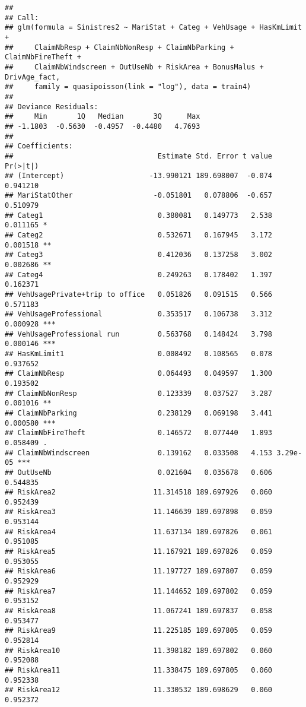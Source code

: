 \documentclass[
]{article}
\begin{document}
\begin{verbatim}
## 
## Call:
## glm(formula = Sinistres2 ~ MariStat + Categ + VehUsage + HasKmLimit + 
##     ClaimNbResp + ClaimNbNonResp + ClaimNbParking + ClaimNbFireTheft + 
##     ClaimNbWindscreen + OutUseNb + RiskArea + BonusMalus + DrivAge_fact, 
##     family = quasipoisson(link = "log"), data = train4)
## 
## Deviance Residuals: 
##     Min       1Q   Median       3Q      Max  
## -1.1803  -0.5630  -0.4957  -0.4480   4.7693  
## 
## Coefficients:
##                                  Estimate Std. Error t value Pr(>|t|)    
## (Intercept)                    -13.990121 189.698007  -0.074 0.941210    
## MariStatOther                   -0.051801   0.078806  -0.657 0.510979    
## Categ1                           0.380081   0.149773   2.538 0.011165 *  
## Categ2                           0.532671   0.167945   3.172 0.001518 ** 
## Categ3                           0.412036   0.137258   3.002 0.002686 ** 
## Categ4                           0.249263   0.178402   1.397 0.162371    
## VehUsagePrivate+trip to office   0.051826   0.091515   0.566 0.571183    
## VehUsageProfessional             0.353517   0.106738   3.312 0.000928 ***
## VehUsageProfessional run         0.563768   0.148424   3.798 0.000146 ***
## HasKmLimit1                      0.008492   0.108565   0.078 0.937652    
## ClaimNbResp                      0.064493   0.049597   1.300 0.193502    
## ClaimNbNonResp                   0.123339   0.037527   3.287 0.001016 ** 
## ClaimNbParking                   0.238129   0.069198   3.441 0.000580 ***
## ClaimNbFireTheft                 0.146572   0.077440   1.893 0.058409 .  
## ClaimNbWindscreen                0.139162   0.033508   4.153 3.29e-05 ***
## OutUseNb                         0.021604   0.035678   0.606 0.544835    
## RiskArea2                       11.314518 189.697926   0.060 0.952439    
## RiskArea3                       11.146639 189.697898   0.059 0.953144    
## RiskArea4                       11.637134 189.697826   0.061 0.951085    
## RiskArea5                       11.167921 189.697826   0.059 0.953055    
## RiskArea6                       11.197727 189.697807   0.059 0.952929    
## RiskArea7                       11.144652 189.697802   0.059 0.953152    
## RiskArea8                       11.067241 189.697837   0.058 0.953477    
## RiskArea9                       11.225185 189.697805   0.059 0.952814    
## RiskArea10                      11.398182 189.697802   0.060 0.952088    
## RiskArea11                      11.338475 189.697805   0.060 0.952338    
## RiskArea12                      11.330532 189.698629   0.060 0.952372    

\end{verbatim}
\end{document}
